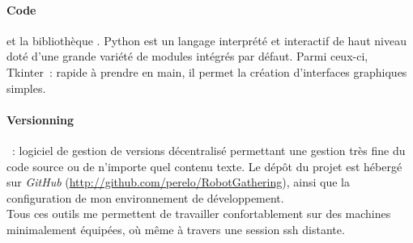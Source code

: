 \paragraph{Code}  et la bibliothèque . Python est
un langage interprété et interactif de haut niveau doté d'une grande variété de
modules intégrés par défaut. Parmi ceux-ci, Tkinter~: rapide à prendre en main,
il permet la création d'interfaces graphiques simples.

\paragraph{Versionning} ~: logiciel de gestion de versions
décentralisé permettant une gestion très fine du code source ou de n'importe
quel contenu texte. Le dépôt du projet est hébergé sur \textit{GitHub}
(\url{http://github.com/perelo/RobotGathering}), ainsi que la configuration de
mon environnement de développement. \\

Tous ces outils me permettent de travailler confortablement sur des machines
minimalement équipées, où même à travers une session ssh distante.
